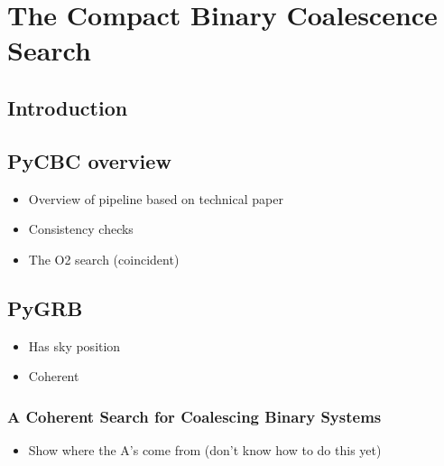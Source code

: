 \documentclass[12pt,twoside,a4paper]{report}
\begin{document}
\chapter{The Compact Binary Coalescence Search} \label{CBC search}
\section{\label{intro}Introduction}

\section{PyCBC overview}
\begin{itemize}
\item Overview of pipeline based on technical paper
\item Consistency checks
\item The O2 search (coincident)
\end{itemize}

\section{PyGRB}
\begin{itemize}
\item Has sky position 
\item Coherent
\end{itemize}


\subsection{A Coherent Search for Coalescing Binary Systems}
\begin{itemize}
\item Show where the A's come from (don't know how to do this yet)
\end{itemize}
\end{document}
